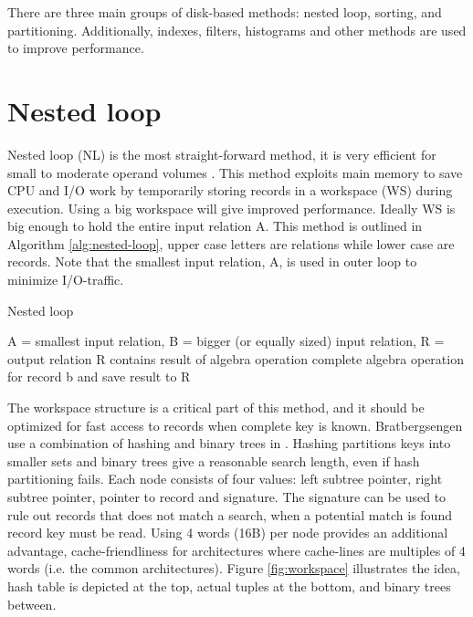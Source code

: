 There are three main groups of disk-based methods: nested loop,
sorting, and partitioning. Additionally, indexes, filters, histograms
and other methods are used to improve performance.

\section{Nested loop}

Nested loop (NL) is the most straight-forward method, it is very
efficient for small to moderate operand volumes \cite{bratbergsengen}.
This method exploits main memory to save CPU and I/O work by
temporarily storing records in a workspace (WS) during execution.
Using a big workspace will give improved performance. Ideally WS is
big enough to hold the entire input relation A. This method is
outlined in Algorithm \ref{alg:nested-loop}, upper case letters are
relations while lower case are records. Note that the smallest input
relation, A, is used in outer loop to minimize I/O-traffic.

\begin{algorithm}
	\caption{Nested loop}
	\label{alg:nested-loop}
	\begin{algorithmic}
		\REQUIRE A = smallest input relation, B = bigger 
		(or equally sized) input relation, R = output relation
		\ENSURE R contains result of algebra operation
					\STATE complete algebra operation for record b and
					save result to R
				\ENDIF
			\ENDFOR
		\ENDWHILE
	\end{algorithmic}
\end{algorithm}

The workspace structure is a critical part of this method, and it
should be optimized for fast access to records when complete key is
known. Bratbergsengen use a combination of hashing and binary trees in
\cite{bratbergsengen}. Hashing partitions keys into smaller sets and
binary trees give a reasonable search length, even if hash
partitioning fails. Each node consists of four values: left subtree
pointer, right subtree pointer, pointer to record and signature. The
signature can be used to rule out records that does not match a
search, when a potential match is found record key must be read.
Using 4 words (16B) per node provides an additional advantage,
cache-friendliness for architectures where cache-lines are multiples
of 4 words (i.e. the common architectures). Figure \ref{fig:workspace}
illustrates the idea, hash table is depicted at the top, actual tuples
at the bottom, and binary trees between.

